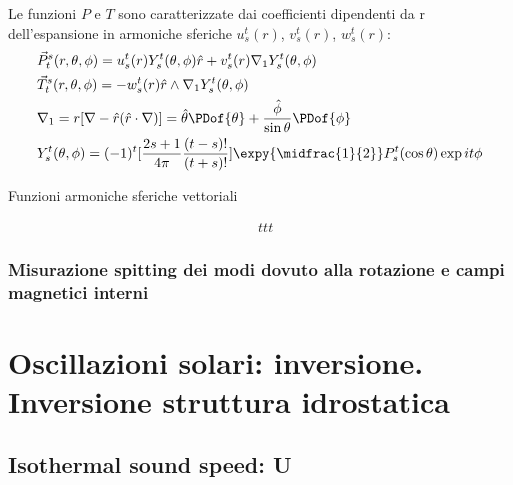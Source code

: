 \begin{refsection}
Le funzioni $P$ e $T$ sono caratterizzate dai coefficienti dipendenti da r dell'espansione in armoniche sferiche $u_s^t(r)$, $v_s^t(r)$, $w_s^t(r)$:
\begin{align*}
&\vec{P}_t^s(r,\theta,\phi)=u_s^t(r)Y_s^t(\theta,\phi)\hat{r}+v_s^t(r)\nabla_1Y_s^t(\theta,\phi)\\
&\vec{T}_t^s(r,\theta,\phi)=-w_s^t(r)\hat{r}\wedge\nabla_1Y_s^t(\theta,\phi)\\
&\nabla_1=r[\nabla-\hat{r}(\hat{r}\cdot\nabla)]=\hat{\theta}\PDof{\theta}+\frac{\hat{\phi}}{\sin{\theta}}\PDof{\phi}\\
&Y_s^t(\theta,\phi)=(-1)^t[\frac{2s+1}{4\pi}\frac{(t-s)!}{(t+s)!}]\expy{\midfrac{1}{2}}P_s^t(\cos{\theta}
)\exp{it\phi}
\end{align*}

\begin{definition}{Funzioni armoniche sferiche vettoriali}

\begin{align*}
&ttt
\end{align*}

\end{definition}

\renewcommand{\footrefs}{{}}

\subsection{Misurazione spitting dei modi dovuto alla rotazione e campi magnetici interni}


\end{refsection}


{\let\clearpage\relax
\chapter{Oscillazioni solari: inversione. Inversione struttura idrostatica}}
\PartialToc


\section{Isothermal sound speed: U}

\begin{refsection}

\begingroup
\nocite{*}
\let\clearpage\relax

\printbibliography[filter={soundspeedU},keyword={rev},heading=bibintoc,title={\textcolor{almond}{Biblio about: ''Isothermal sound speed U''}}]
\printbibliography[filter={soundspeedU},notkeyword={rev},heading=bibintoc,title={\textcolor{almond}{Other refs about: ''Isotherma sound speed U.''}}]


\endgroup


\end{refsection}


